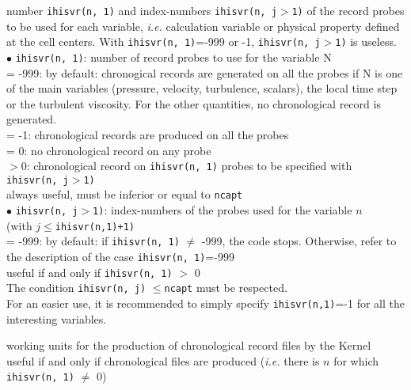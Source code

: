 {number {\tt ihisvr(n, 1)} and index-numbers {\tt ihisvr(n, j$>$1)} of the record
probes to be used for each variable, {\em i.e.} calculation variable
or physical property defined at the cell centers.
With {\tt ihisvr(n, 1)}=-999 or -1, {\tt ihisvr(n, j$>$1)} is useless.\\
\hspace*{.5cm} $\bullet$ {\tt ihisvr(n, 1)}: number of record probes to use
for the variable N\\
\hspace*{1.3cm}= -999: by default: chronogical records are generated on
all the probes if N is one of the main variables (pressure, velocity,
turbulence, scalars), the local time step or the turbulent
viscosity. For the other quantities, no chronological record is generated.\\
\hspace*{1.3cm}= -1: chronological records are produced on all the probes\\
\hspace*{1.3cm}= 0: no chronological record on any probe\\
\hspace*{1.3cm}$>0$: chronological record on {\tt ihisvr(n, 1)} probes to be
specified with  {\tt ihisvr(n, j$>$1)}\\
always useful, must be inferior or equal to {\tt ncapt}\\
\hspace*{.5cm} $\bullet$ {\tt ihisvr(n, j$>$1)}: index-numbers of the probes
used for the variable $n$\\
(with $j$$\leqslant${\tt ihisvr(n,1)+1)}\\
\hspace*{1.3cm}= -999: by default: if {\tt ihisvr(n, 1)} $\ne$
-999, the  code stops. Otherwise, refer to the description of the case
{\tt ihisvr(n, 1)}=-999\\
useful if and only if {\tt ihisvr(n, 1)} $>$ 0 \\
The condition {\tt ihisvr(n, j)} $\leqslant${\tt ncapt} must be respected.\\
For an easier use, it is recommended to simply specify {\tt ihisvr(n,1)}=-1 for
all the interesting variables.}

{working units for the production of chronological record files by the Kernel\\
useful if and only if chronological files are produced ({\em i.e.} there
is $n$ for which {\tt ihisvr(n, 1)} $\ne$ 0)}

